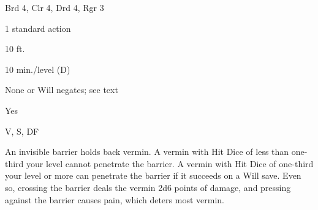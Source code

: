 
\begin{description*}
\item[Level:] Brd 4, Clr 4, Drd 4, Rgr 3
\item[Casting Time:] 1 standard action
\item[Range:] 10 ft.
\item[Duration:] 10 min./level (D)
\item[Saving Throw:] None or Will negates; see text
\item[Spell Resistance:] Yes
\item[Components:] V, S, DF
\end{description*}

An invisible barrier holds back vermin. A vermin with Hit Dice of less than one-third
your level cannot penetrate the barrier.
A vermin with Hit Dice of one-third your level or more can penetrate the barrier
if it succeeds on a Will save. Even so, crossing the barrier deals the vermin 2d6
points of damage, and pressing against the barrier causes pain, which deters most
vermin.